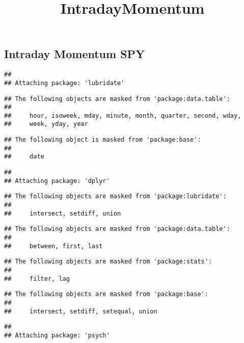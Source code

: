\documentclass[]{article}
\title{IntradayMomentum}
\author{}
\date{}
\begin{document}
\maketitle

\hypertarget{intraday-momentum-spy}{%
\subsection{Intraday Momentum SPY}\label{intraday-momentum-spy}}

\begin{verbatim}
## 
## Attaching package: 'lubridate'
\end{verbatim}

\begin{verbatim}
## The following objects are masked from 'package:data.table':
## 
##     hour, isoweek, mday, minute, month, quarter, second, wday,
##     week, yday, year
\end{verbatim}

\begin{verbatim}
## The following object is masked from 'package:base':
## 
##     date
\end{verbatim}

\begin{verbatim}
## 
## Attaching package: 'dplyr'
\end{verbatim}

\begin{verbatim}
## The following objects are masked from 'package:lubridate':
## 
##     intersect, setdiff, union
\end{verbatim}

\begin{verbatim}
## The following objects are masked from 'package:data.table':
## 
##     between, first, last
\end{verbatim}

\begin{verbatim}
## The following objects are masked from 'package:stats':
## 
##     filter, lag
\end{verbatim}

\begin{verbatim}
## The following objects are masked from 'package:base':
## 
##     intersect, setdiff, setequal, union
\end{verbatim}

\begin{verbatim}
## 
## Attaching package: 'psych'
\end{verbatim}
\end{document}
